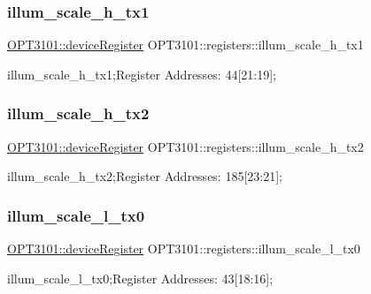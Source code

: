 \subsubsection{\texorpdfstring{illum\+\_\+scale\+\_\+h\+\_\+tx1}{illum\_scale\_h\_tx1}}
{\footnotesize\ttfamily \mbox{\hyperlink{class_o_p_t3101_1_1device_register}{O\+P\+T3101\+::device\+Register}} O\+P\+T3101\+::registers\+::illum\+\_\+scale\+\_\+h\+\_\+tx1}



illum\+\_\+scale\+\_\+h\+\_\+tx1;Register Addresses\+: 44\mbox{[}21\+:19\mbox{]}; 

\mbox{\label{class_o_p_t3101_1_1registers_a01e437455fdcf3e98fa2315da38afb48}} 
\subsubsection{\texorpdfstring{illum\+\_\+scale\+\_\+h\+\_\+tx2}{illum\_scale\_h\_tx2}}
{\footnotesize\ttfamily \mbox{\hyperlink{class_o_p_t3101_1_1device_register}{O\+P\+T3101\+::device\+Register}} O\+P\+T3101\+::registers\+::illum\+\_\+scale\+\_\+h\+\_\+tx2}



illum\+\_\+scale\+\_\+h\+\_\+tx2;Register Addresses\+: 185\mbox{[}23\+:21\mbox{]}; 

\mbox{\label{class_o_p_t3101_1_1registers_a16c4b06813716b1a536015e7089c2d22}} 
\subsubsection{\texorpdfstring{illum\+\_\+scale\+\_\+l\+\_\+tx0}{illum\_scale\_l\_tx0}}
{\footnotesize\ttfamily \mbox{\hyperlink{class_o_p_t3101_1_1device_register}{O\+P\+T3101\+::device\+Register}} O\+P\+T3101\+::registers\+::illum\+\_\+scale\+\_\+l\+\_\+tx0}



illum\+\_\+scale\+\_\+l\+\_\+tx0;Register Addresses\+: 43\mbox{[}18\+:16\mbox{]}; 

